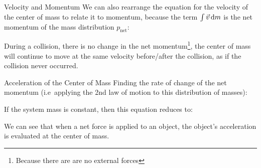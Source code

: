 \documentclass[12pt,compress,aspectratio=169]{beamer}
\begin{document}
\begin{frame}{Velocity and Momentum}
  We can also rearrange the equation for the velocity of the center of mass to
  relate it to momentum, because the term $\int\vec v\dl m$ is the net momentum
  of the mass distribution $p_\text{net}$:
  

  During a collision, there is no change in the net momentum\footnote{Because
  there are are no external forces}, the center of mass will continue to move
  at the same velocity before/after the collision, as if the collision never
  occurred.
\end{frame}



\begin{frame}{Acceleration of the Center of Mass}
  Finding the rate of change of the net momentum (i.e\ applying the 2nd law of
  motion to this distribution of masses):
  

  If the system mass is constant, then this equation reduces to:

  
  We can see that when a net force is applied to an object, the object's
  acceleration is evaluated at the center of mass.
\end{frame}



\end{document}
